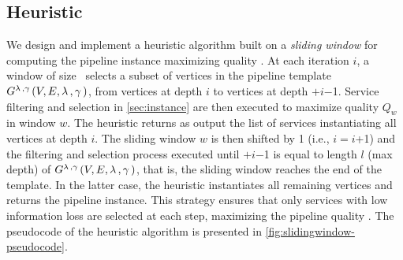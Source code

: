 \subsection{Heuristic}\label{subsec:heuristics}
We design and implement a heuristic algorithm built on a \emph{sliding window} for computing the pipeline instance maximizing quality \q.
At each iteration $i$, a window of size \windowsize\ selects a subset of vertices in the pipeline template $G^{\lambda\,,\gamma\,}(V,E,\lambda\,,\gamma\,)$, from vertices at depth $i$ to vertices at depth \windowsize$+$$i$$-$1.
Service filtering and selection in \cref{sec:instance} are then executed to maximize quality $Q_w$ in window $w$. The heuristic returns as output the list of services instantiating all vertices at depth $i$. The sliding window $w$ is then shifted by 1 (i.e., $i$$=$$i$+1) and the filtering and selection process executed until \windowsize$+$$i$$-$1 is equal to length $l$ (max depth) of $G^{\lambda\,,\gamma\,}(V,E,\lambda\,,\gamma\,)$, that is, the sliding window reaches the end of the template. In the latter case, the heuristic instantiates all remaining vertices and returns the pipeline instance.
This strategy ensures that only services with low information loss are selected at each step, maximizing the pipeline quality \q. The pseudocode of the heuristic algorithm is presented in \cref{fig:slidingwindow-pseudocode}.
\newenvironment{redtext}{\footnotesize	\color{gray}}{~~}
